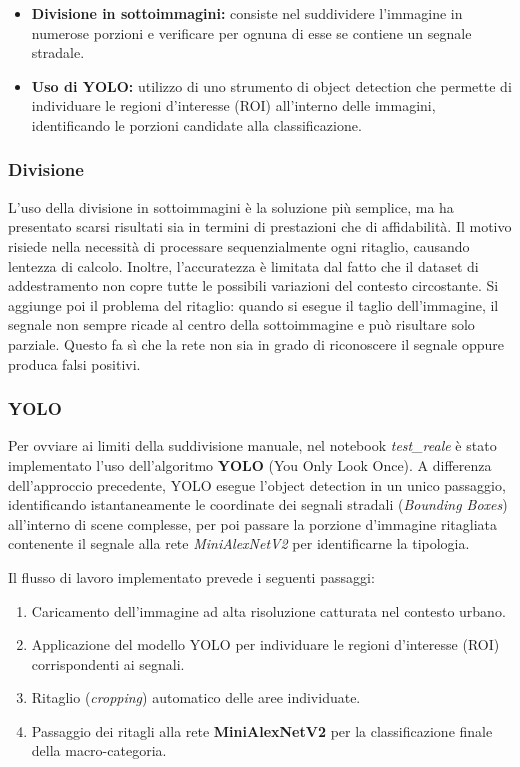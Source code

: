 \begin{itemize}
    \item \textbf{Divisione in sottoimmagini:} consiste nel suddividere l'immagine in numerose porzioni e verificare per ognuna di esse se contiene un segnale stradale.
    \item \textbf{Uso di YOLO:} utilizzo di uno strumento di object detection che permette di individuare le regioni d'interesse (ROI) all'interno delle immagini, identificando le porzioni candidate alla classificazione.
\end{itemize}

\subsubsection{Divisione}
L'uso della divisione in sottoimmagini è la soluzione più semplice, ma ha presentato scarsi risultati sia in termini di prestazioni che di affidabilità. Il motivo risiede nella necessità di processare sequenzialmente ogni ritaglio, causando lentezza di calcolo. Inoltre, l'accuratezza è limitata dal fatto che il dataset di addestramento non copre tutte le possibili variazioni del contesto circostante. Si aggiunge poi il problema del ritaglio: quando si esegue il taglio dell'immagine, il segnale non sempre ricade al centro della sottoimmagine e può risultare solo parziale. Questo fa sì che la rete non sia in grado di riconoscere il segnale oppure produca falsi positivi.

\subsubsection{YOLO}
Per ovviare ai limiti della suddivisione manuale, nel notebook \textit{test\_reale} è stato implementato l'uso dell'algoritmo \textbf{YOLO} (You Only Look Once). A differenza dell'approccio precedente, YOLO esegue l'object detection in un unico passaggio, identificando istantaneamente le coordinate dei segnali stradali (\textit{Bounding Boxes}) all'interno di scene complesse, per poi passare la porzione d'immagine ritagliata contenente il segnale alla rete \textit{MiniAlexNetV2} per identificarne la tipologia.

Il flusso di lavoro implementato prevede i seguenti passaggi:
\begin{enumerate}
    \item Caricamento dell'immagine ad alta risoluzione catturata nel contesto urbano.
    \item Applicazione del modello YOLO per individuare le regioni d'interesse (ROI) corrispondenti ai segnali.
    \item Ritaglio (\textit{cropping}) automatico delle aree individuate.
    \item Passaggio dei ritagli alla rete \textbf{MiniAlexNetV2} per la classificazione finale della macro-categoria.
\end{enumerate}


